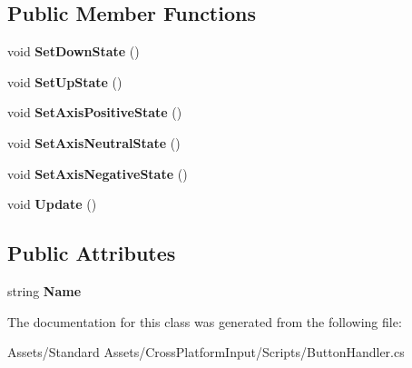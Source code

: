 \subsection*{Public Member Functions}
\begin{DoxyCompactItemize}
\item 
void {\bfseries Set\+Down\+State} ()\hypertarget{class_unity_standard_assets_1_1_cross_platform_input_1_1_button_handler_a77cfb8fa2c78ff59e1a2cc20fd139943}{}\label{class_unity_standard_assets_1_1_cross_platform_input_1_1_button_handler_a77cfb8fa2c78ff59e1a2cc20fd139943}

\item 
void {\bfseries Set\+Up\+State} ()\hypertarget{class_unity_standard_assets_1_1_cross_platform_input_1_1_button_handler_a88b2609ff142d16d32fd5c5e2b6db0c7}{}\label{class_unity_standard_assets_1_1_cross_platform_input_1_1_button_handler_a88b2609ff142d16d32fd5c5e2b6db0c7}

\item 
void {\bfseries Set\+Axis\+Positive\+State} ()\hypertarget{class_unity_standard_assets_1_1_cross_platform_input_1_1_button_handler_a5fbaa8e9fdb70c05e7ba82bed1333e55}{}\label{class_unity_standard_assets_1_1_cross_platform_input_1_1_button_handler_a5fbaa8e9fdb70c05e7ba82bed1333e55}

\item 
void {\bfseries Set\+Axis\+Neutral\+State} ()\hypertarget{class_unity_standard_assets_1_1_cross_platform_input_1_1_button_handler_a0c828c03ae8cc3f153d2b60063b6fbf8}{}\label{class_unity_standard_assets_1_1_cross_platform_input_1_1_button_handler_a0c828c03ae8cc3f153d2b60063b6fbf8}

\item 
void {\bfseries Set\+Axis\+Negative\+State} ()\hypertarget{class_unity_standard_assets_1_1_cross_platform_input_1_1_button_handler_a4385e667aabc4bd3c982b0ff8ae32933}{}\label{class_unity_standard_assets_1_1_cross_platform_input_1_1_button_handler_a4385e667aabc4bd3c982b0ff8ae32933}

\item 
void {\bfseries Update} ()\hypertarget{class_unity_standard_assets_1_1_cross_platform_input_1_1_button_handler_ade485d05b86c16a062378cb34c169c2b}{}\label{class_unity_standard_assets_1_1_cross_platform_input_1_1_button_handler_ade485d05b86c16a062378cb34c169c2b}

\end{DoxyCompactItemize}
\subsection*{Public Attributes}
\begin{DoxyCompactItemize}
\item 
string {\bfseries Name}\hypertarget{class_unity_standard_assets_1_1_cross_platform_input_1_1_button_handler_a7f295fca8edd514c0b8999ce0c78c34b}{}\label{class_unity_standard_assets_1_1_cross_platform_input_1_1_button_handler_a7f295fca8edd514c0b8999ce0c78c34b}

\end{DoxyCompactItemize}


The documentation for this class was generated from the following file\+:\begin{DoxyCompactItemize}
\item 
Assets/\+Standard Assets/\+Cross\+Platform\+Input/\+Scripts/Button\+Handler.\+cs\end{DoxyCompactItemize}
